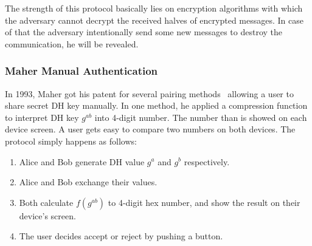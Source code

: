 The strength of this protocol basically lies on encryption algorithms with which the adversary cannot decrypt the received halves of encrypted messages. In case of that the adversary intentionally send some new messages to destroy the communication, he will be revealed. 

\subsubsection{Maher Manual Authentication}

In 1993, Maher got his patent for several pairing methods~\cite{maher} allowing a user to share secret DH key manually. In one method, he applied a compression function to interpret DH key $g^{ab}$ into 4-digit number. The number than is showed on each device screen. A user gets easy to compare two numbers on both devices. The protocol simply happens as follows: 
\begin{enumerate}
\item Alice and Bob generate DH value $g^a$ and $g^b$ respectively. 
\item Alice and Bob exchange their values. 
\item Both calculate $f(g^{ab})$ to 4-digit hex number, and show the result on their device's screen. 
\item The user decides accept or reject by pushing a button. 
\end{enumerate}

\begin{center}
\end{center}

